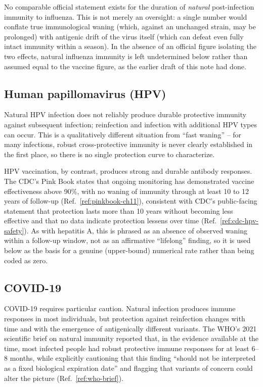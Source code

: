\documentclass[11pt]{article}
\begin{document}
No comparable official statement exists for the duration of \emph{natural}
post-infection immunity to influenza. This is not merely an oversight: a
single number would conflate true immunological waning (which, against an
unchanged strain, may be prolonged) with antigenic drift of the virus
itself (which can defeat even fully intact immunity within a season). In
the absence of an official figure isolating the two effects, natural
influenza immunity is left undetermined below rather than assumed equal to
the vaccine figure, as the earlier draft of this note had done.

\subsection{Human papillomavirus (HPV)}

Natural HPV infection does not reliably produce durable protective immunity
against subsequent infection; reinfection and infection with additional
HPV types can occur. This is a qualitatively different situation from
``fast waning'' -- for many infections, robust cross-protective immunity
is never clearly established in the first place, so there is no single
protection curve to characterize.

HPV vaccination, by contrast, produces strong and durable antibody
responses. The CDC's Pink Book states that ongoing monitoring has
demonstrated vaccine effectiveness above 90\%, with no waning of immunity
through at least 10 to 12 years of follow-up (Ref.~\ref{ref:pinkbook-ch11}),
consistent with CDC's public-facing statement that protection lasts more
than 10 years without becoming less effective and that no data indicate
protection lessens over time (Ref.~\ref{ref:cdc-hpv-safety}). As with
hepatitis A, this is phrased as an absence of observed waning within a
follow-up window, not as an affirmative ``lifelong'' finding, so it is used
below as the basis for a genuine (upper-bound) numerical rate rather than
being coded as zero.

\subsection{COVID-19}

COVID-19 requires particular caution. Natural infection produces immune
responses in most individuals, but protection against reinfection changes
with time and with the emergence of antigenically different variants. The
WHO's 2021 scientific brief on natural immunity reported that, in the
evidence available at the time, most infected people had robust protective
immune responses for at least 6--8 months, while explicitly cautioning that
this finding ``should not be interpreted as a fixed biological expiration
date'' and flagging that variants of concern could alter the picture
(Ref.~\ref{ref:who-brief}).
\end{document}
